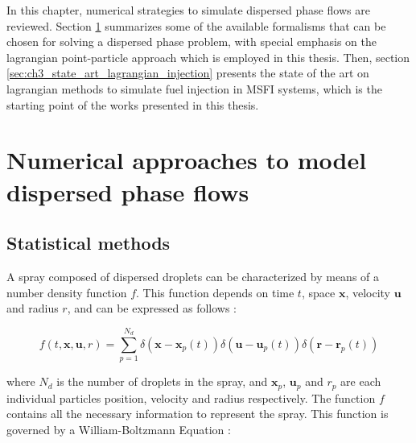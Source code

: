 In this chapter, numerical strategies to simulate dispersed phase flows are reviewed. Section \ref{sec:ch3_numerical_approaches_dispersed_phase} summarizes some of the available formalisms that can be chosen for solving a dispersed phase problem, with special emphasis on the lagrangian point-particle approach which is employed in this thesis. Then, section \ref{sec:ch3_state_art_lagrangian_injection} presents the state of the art on lagrangian methods to simulate fuel injection in MSFI systems, which is the starting point of the works presented in this thesis.

\section{Numerical approaches to model dispersed phase flows}
\label{sec:ch3_numerical_approaches_dispersed_phase}



\subsection{Statistical methods}
\label{subsec:ch3_statistical_methods}

A spray composed of dispersed droplets can be characterized by means of a number density function $f$. This function depends on time $t$, space $\textbf{x}$, velocity $\textbf{u}$ and radius $r$, and can be expressed as follows :

\begin{equation}
\label{eq:f_spray_description_subramanian}
f \left( t, \textbf{x}, \textbf{u}, r \right) = \sum_{p=1}^{N_d} \delta \left( \textbf{x} - \textbf{x}_p \left( t \right) \right)  \delta \left( \textbf{u} - \textbf{u}_p \left( t \right) \right) \delta \left( \textbf{r} - \textbf{r}_p \left( t \right) \right)
\end{equation}

where $N_d$ is the number of droplets in the spray, and $\textbf{x}_p$, $\textbf{u}_p$ and $r_p$ are each individual particles position, velocity and radius respectively. The function $f$ contains all the necessary information to represent the spray. This function is governed by a William-Boltzmann Equation :

